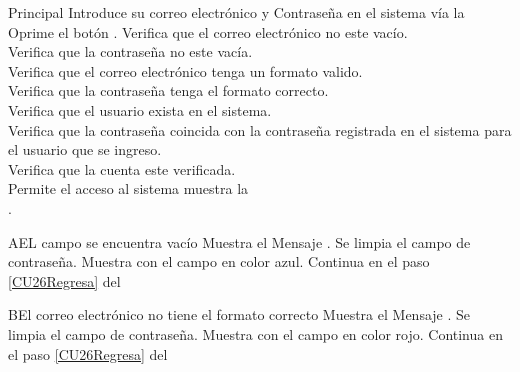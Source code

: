 \begin{UCtrayectoria}{Principal}
	\UCpaso[\UCactor] Introduce su correo electrónico y Contraseña en el sistema vía la \\
	\UCpaso[\UCactor] Oprime el botón .\label{CU26Regresa}
	\UCpaso Verifica que el correo electrónico no este vacío.
	    \\ 
	\UCpaso Verifica que la contraseña no este vacía.
	    \\ 
	\UCpaso Verifica que el correo electrónico tenga un formato valido.
	    \\ 
	\UCpaso Verifica que la contraseña tenga el formato correcto.
	    \\ 
	\UCpaso Verifica que el usuario exista en el sistema. 
	    \\ 
	\UCpaso Verifica que la contraseña coincida con la contraseña registrada en el sistema para el usuario que se ingreso.
	    \\ 
	\UCpaso Verifica que la cuenta este verificada.
	    \\ 
	\UCpaso Permite el acceso al sistema muestra la                      \\.
\end{UCtrayectoria}


\begin{UCtrayectoriaA}{A}{EL campo se encuentra vacío}
	\UCpaso Muestra el Mensaje \textbf{}.
	\UCpaso Se limpia el campo de contraseña.
    \UCpaso Muestra  con el campo en color azul.
	\UCpaso Continua en el paso \ref{CU26Regresa} del 
\end{UCtrayectoriaA}
		
\begin{UCtrayectoriaA}{B}{El correo electrónico no tiene el formato correcto}
    \UCpaso Muestra el Mensaje \textbf{}.
    \UCpaso Se limpia el campo de contraseña.
    \UCpaso Muestra  con el campo en color rojo.
	\UCpaso Continua en el paso \ref{CU26Regresa} del 
\end{UCtrayectoriaA}


